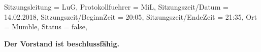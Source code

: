



\begin{Protokoll}{
        Sitzungsleitung                 = {LuG},             %
        Protokollfuehrer                = {MiL},              %
        Sitzungszeit/Datum              = {14.02.2018},       %
        Sitzungszeit/BeginnZeit         = {20:05},            %
        Sitzungszeit/EndeZeit           = {21:35},            %
        Ort                             = {Mumble},            %
Status                          = {false},            %
		    }
    
    
    \begin{Anwesenheitsliste}
    \end{Anwesenheitsliste}
    
    \textbf{Der Vorstand ist beschlussfähig.}

    


\end{Protokoll}
